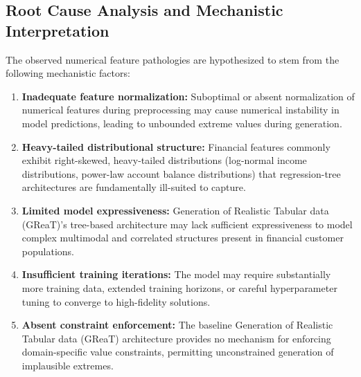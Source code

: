 \documentclass[10pt,conference,a4paper]{IEEEtran}
\begin{document}
\subsection{Root Cause Analysis and Mechanistic Interpretation}
The observed numerical feature pathologies are hypothesized to stem from the following mechanistic factors:
\begin{enumerate}
    \item \textbf{Inadequate feature normalization:} Suboptimal or absent normalization of numerical features during preprocessing may cause numerical instability in model predictions, leading to unbounded extreme values during generation.
    \item \textbf{Heavy-tailed distributional structure:} Financial features commonly exhibit right-skewed, heavy-tailed distributions (log-normal income distributions, power-law account balance distributions) that regression-tree architectures are fundamentally ill-suited to capture.
    \item \textbf{Limited model expressiveness:} Generation of Realistic Tabular data (GReaT)'s tree-based architecture may lack sufficient expressiveness to model complex multimodal and correlated structures present in financial customer populations.
    \item \textbf{Insufficient training iterations:} The model may require substantially more training data, extended training horizons, or careful hyperparameter tuning to converge to high-fidelity solutions.
    \item \textbf{Absent constraint enforcement:} The baseline Generation of Realistic Tabular data (GReaT) architecture provides no mechanism for enforcing domain-specific value constraints, permitting unconstrained generation of implausible extremes.
\end{enumerate}
\end{document}
